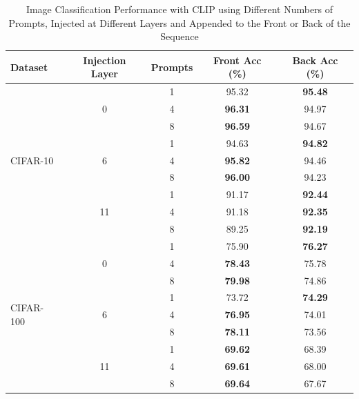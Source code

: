 \documentclass[a4paper]{article}
\begin{document}
\begin{table}[h]
    \centering
    \begin{tabular}{|l|c|c|c|c|}
    \hline
    \rowcolor{Gray}
    \textbf{Dataset} & \textbf{Injection Layer} & \textbf{Prompts} & \textbf{Front Acc (\%)} & \textbf{Back Acc (\%)} \\ \hline
    \multirow{9}{*}{CIFAR-10}  
                               & \multirow{3}{*}{0} & 1 & 95.32 & \textbf{95.48} \\ \cline{3-5}
                               &                     & 4 & \textbf{96.31} & 94.97 \\ \cline{3-5}
                               &                     & 8 & \textbf{96.59} & 94.67 \\ \cline{2-5}
                               & \multirow{3}{*}{6} & 1 & 94.63  & \textbf{94.82} \\ \cline{3-5}
                               &                     & 4 & \textbf{95.82} & 94.46 \\ \cline{3-5}
                               &                     & 8 & \textbf{96.00} & 94.23 \\ \cline{2-5}
                               & \multirow{3}{*}{11}& 1 & 91.17  & \textbf{92.44} \\ \cline{3-5}
                               &                     & 4 & 91.18  & \textbf{92.35} \\ \cline{3-5}
                               &                     & 8 & 89.25  & \textbf{92.19} \\ \hline
    \multirow{9}{*}{CIFAR-100} 
                               & \multirow{3}{*}{0} & 1 & 75.90  & \textbf{76.27} \\ \cline{3-5}
                               &                     & 4 & \textbf{78.43} & 75.78 \\ \cline{3-5}
                               &                     & 8 & \textbf{79.98} & 74.86 \\ \cline{2-5}
                               & \multirow{3}{*}{6} & 1 & 73.72  & \textbf{74.29} \\ \cline{3-5}
                               &                     & 4 & \textbf{76.95} & 74.01 \\ \cline{3-5}
                               &                     & 8 & \textbf{78.11} & 73.56 \\ \cline{2-5}
                               & \multirow{3}{*}{11}& 1 & \textbf{69.62} & 68.39 \\ \cline{3-5}
                               &                     & 4 & \textbf{69.61} & 68.00 \\ \cline{3-5}
                               &                     & 8 & \textbf{69.64} & 67.67 \\ \hline
    \end{tabular}
    \caption{Image Classification Performance with CLIP using Different Numbers of Prompts, Injected at Different Layers and Appended to the Front or Back of the Sequence}
    \label{tab:clip_accuracy_deep_prompts}
\end{table}
\end{document}
